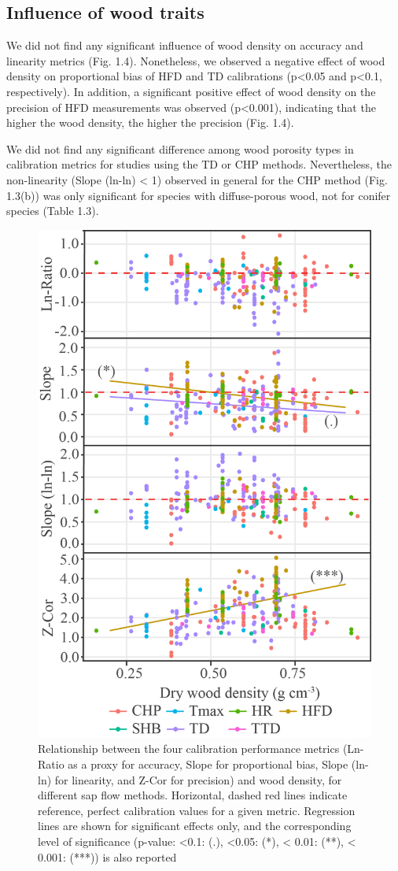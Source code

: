 \documentclass[11pt,twoside]{reedthesis}
\begin{document}
\subsection{Influence of wood traits}\label{influence-of-wood-traits}

We did not find any significant influence of wood density on accuracy
and linearity metrics (Fig. 1.4). Nonetheless, we observed a negative
effect of wood density on proportional bias of HFD and TD calibrations
(p\textless{}0.05 and p\textless{}0.1, respectively). In addition, a
significant positive effect of wood density on the precision of HFD
measurements was observed (p\textless{}0.001), indicating that the
higher the wood density, the higher the precision (Fig. 1.4).\par

We did not find any significant difference among wood porosity types in
calibration metrics for studies using the TD or CHP methods.
Nevertheless, the non-linearity (Slope (ln-ln) \textless{} 1) observed
in general for the CHP method (Fig. 1.3(b)) was only significant for
species with diffuse-porous wood, not for conifer species (Table
1.3).\par
\begin{figure}[hbt!]

{\centering \includegraphics[width=0.55\linewidth]{figure/CH2/DENSITY} 

}

\caption[Relationship between the four calibration performance and wood density, for different sap flow methods.]{Relationship between the four calibration performance metrics (Ln-Ratio as a proxy for accuracy, Slope for proportional bias, Slope (ln-ln) for linearity, and Z-Cor for precision) and wood density, for different sap flow methods. Horizontal, dashed red lines indicate reference, perfect calibration values for a given metric. Regression lines are shown for significant effects only, and the corresponding level of significance (p-value: <0.1: (.), <0.05: (*), < 0.01: (**), < 0.001: (***)) is also reported }\label{fig:ch2fig4}
\end{figure}
\end{document}
